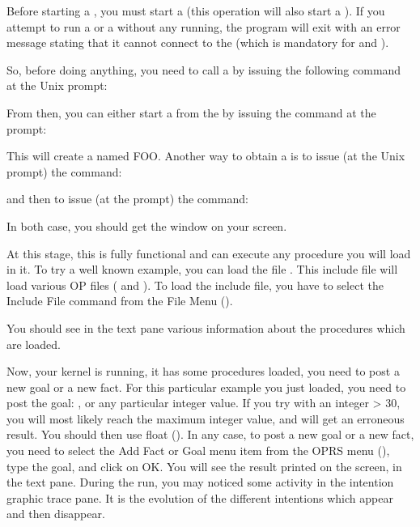 Before starting a \XPK{}, you must start a \OPRSS{} (this operation
will also start a \MPA{}). If you attempt to run a \XPK{} or a \CPK{}
without any \OPRSS{} running, the program will exit with an error
message stating that it cannot connect to the \MPA{} (which is mandatory
for \XPK{} and \CPK{}).

So, before doing anything, you need to call a \OPRSS{} by issuing
the following command at the Unix prompt:


From then, you can either start a \XPK{} from the \OPRSS{} by issuing
the command at the \OPRSS{} prompt:


This will create a \XPK{} named FOO. Another way to obtain a \XPK{} is to
issue (at the Unix prompt) the command:


and then to issue (at the \OPRSS{} prompt) the command:


In both case, you should get the \XPK{} window on your screen.

At this stage, this \XPK{} is fully functional and can execute any
procedure you will load in it. To try a well known example, you can load
the file . This include file will
load various OP files ( and
). To load the include file,
you have to select the Include File command from the File Menu
().

You should see in the text pane various information about the procedures
which are loaded.

Now, your kernel is running, it has some procedures loaded, you need to
post a new goal or a new fact. For this particular example you just loaded,
you need to post the goal: , or any
particular integer value. If you try with an integer > 30, you will most
likely reach the maximum integer value, and will get an erroneous result.
You should then use float (). In any
case, to post a new goal or a new fact, you need to select the Add Fact or
Goal menu item from the OPRS menu (), type the goal,
and click on OK. You will see the result printed on the screen, in the text
pane. During the run, you may  noticed some activity in the intention
graphic trace pane. It is the evolution of the different intentions
which appear and then disappear.

